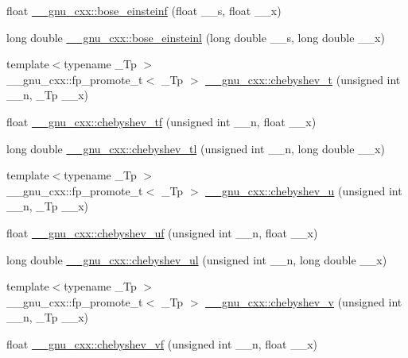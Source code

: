 \begin{DoxyCompactItemize}
\item 
float \hyperlink{group__gnu__math__spec__func_gac1fb313fba5639d4168b6ee682507688}{\+\_\+\+\_\+gnu\+\_\+cxx\+::bose\+\_\+einsteinf} (float \+\_\+\+\_\+s, float \+\_\+\+\_\+x)
\item 
long double \hyperlink{group__gnu__math__spec__func_ga995c3ff580f81afb139f9cd50f445b48}{\+\_\+\+\_\+gnu\+\_\+cxx\+::bose\+\_\+einsteinl} (long double \+\_\+\+\_\+s, long double \+\_\+\+\_\+x)
\item 
{\footnotesize template$<$typename \+\_\+\+Tp $>$ }\\\+\_\+\+\_\+gnu\+\_\+cxx\+::fp\+\_\+promote\+\_\+t$<$ \+\_\+\+Tp $>$ \hyperlink{group__gnu__math__spec__func_ga4d9cae9de13a64ceeb4fb0226f4b7844}{\+\_\+\+\_\+gnu\+\_\+cxx\+::chebyshev\+\_\+t} (unsigned int \+\_\+\+\_\+n, \+\_\+\+Tp \+\_\+\+\_\+x)
\item 
float \hyperlink{group__gnu__math__spec__func_gab8cdb55702d9c8b85af4ecc3d8c6a134}{\+\_\+\+\_\+gnu\+\_\+cxx\+::chebyshev\+\_\+tf} (unsigned int \+\_\+\+\_\+n, float \+\_\+\+\_\+x)
\item 
long double \hyperlink{group__gnu__math__spec__func_ga0c421700d244cdf58e3ac5ff267664d1}{\+\_\+\+\_\+gnu\+\_\+cxx\+::chebyshev\+\_\+tl} (unsigned int \+\_\+\+\_\+n, long double \+\_\+\+\_\+x)
\item 
{\footnotesize template$<$typename \+\_\+\+Tp $>$ }\\\+\_\+\+\_\+gnu\+\_\+cxx\+::fp\+\_\+promote\+\_\+t$<$ \+\_\+\+Tp $>$ \hyperlink{group__gnu__math__spec__func_gafa90c06bdedb8459f20576297cf1608f}{\+\_\+\+\_\+gnu\+\_\+cxx\+::chebyshev\+\_\+u} (unsigned int \+\_\+\+\_\+n, \+\_\+\+Tp \+\_\+\+\_\+x)
\item 
float \hyperlink{group__gnu__math__spec__func_ga4b28c2a079eae2e9612c9902801ca256}{\+\_\+\+\_\+gnu\+\_\+cxx\+::chebyshev\+\_\+uf} (unsigned int \+\_\+\+\_\+n, float \+\_\+\+\_\+x)
\item 
long double \hyperlink{group__gnu__math__spec__func_ga11ec202d6aacafba1182e962ecf02978}{\+\_\+\+\_\+gnu\+\_\+cxx\+::chebyshev\+\_\+ul} (unsigned int \+\_\+\+\_\+n, long double \+\_\+\+\_\+x)
\item 
{\footnotesize template$<$typename \+\_\+\+Tp $>$ }\\\+\_\+\+\_\+gnu\+\_\+cxx\+::fp\+\_\+promote\+\_\+t$<$ \+\_\+\+Tp $>$ \hyperlink{group__gnu__math__spec__func_ga32b7decd0002f542d2c9187c5f0846c6}{\+\_\+\+\_\+gnu\+\_\+cxx\+::chebyshev\+\_\+v} (unsigned int \+\_\+\+\_\+n, \+\_\+\+Tp \+\_\+\+\_\+x)
\item 
float \hyperlink{group__gnu__math__spec__func_gaa9635a0da4bdeaa8060ae5cf03c3a12d}{\+\_\+\+\_\+gnu\+\_\+cxx\+::chebyshev\+\_\+vf} (unsigned int \+\_\+\+\_\+n, float \+\_\+\+\_\+x)

\end{DoxyCompactItemize}
